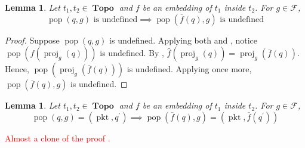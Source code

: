 \documentclass{amsart}
\DeclareMathOperator{\pkt}{\mathrm{pkt}}
\DeclareMathOperator{\pop}{\mathrm{pop}}
\DeclareMathOperator{\proj}{\mathrm{proj}}
\DeclareMathOperator{\Topo}{\mathbf{Topo}}
\newtheorem{lem}[thm]{Lemma}
\theoremstyle{definition}
\begin{document}
\begin{lem}
    \label{lem:sim1}
    Let $t_1, t_2 \in \Topo$ and $f$ be an embedding of $t_1$ inside $t_2$. For $g \in \mathcal F$,
    $$\pop(q, g) \text{ is undefined} \implies \pop(\overline{f}(q), g) \text{ is undefined}$$
\end{lem}

\begin{proof}
    Suppose $\pop(q, g)$ is undefined. 
    Applying both  and \cite[Lemma ~5.6]{OG}, notice $\pop(\widehat{f}(\proj_g(q)))$ is undefined.
    By , $\widehat{f}(\proj_g(q)) = \proj_g(\overline{f}(q))$.
    Hence, $\pop(\proj_g(\overline{f}(q)))$ is undefined.
    Applying  once more, $\pop(\overline{f}(q), g)$ is undefined.
\end{proof}

\begin{lem}
    \label{lem:sim2}
    Let $t_1, t_2 \in \Topo$ and $f$ be an embedding of $t_1$ inside $t_2$. For $g \in \mathcal F$,
    $$\pop(q, g) = (\pkt, q^\prime) \implies \pop(\overline{f}(q), g) = (\pkt, \overline{f}(q^\prime))$$
\end{lem}

\textcolor{red}{Almost a clone of the proof \cite[Lemma ~5.7]{OG}.}
\end{document}
